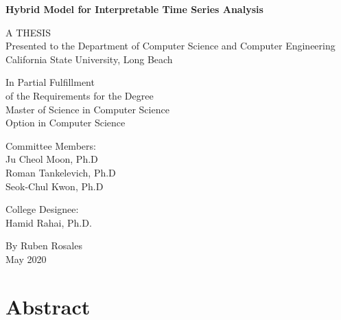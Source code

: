 \documentclass{turabian-thesis}
\begin{document}
\frontmatter
\thispagestyle{empty}

\begin{center}
   
   \textbf{Hybrid Model for Interpretable Time Series Analysis}
   
   \vspace*{\baselineskip} 
      
   A THESIS \\
   Presented to the Department of Computer Science and Computer Engineering \\
   California State University, Long Beach
   
   \vspace*{\baselineskip} 

   In Partial Fulfillment \\
   of the Requirements for the Degree \\
   Master of Science in Computer Science \\
   Option in Computer Science
   
   \vspace*{\baselineskip} 

   Committee Members: \\
   Ju Cheol Moon, Ph.D \\
   Roman Tankelevich, Ph.D \\
   Seok-Chul Kwon, Ph.D

   \vspace*{\baselineskip} 

   College Designee: \\
   Hamid Rahai, Ph.D.
   
   \vspace*{\baselineskip} 

   By Ruben Rosales \\
   May 2020
\end{center}

\pagebreak

\chapter*{Abstract}

\end{document}
